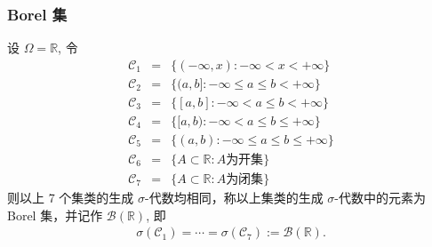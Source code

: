\begin{frame}
	\frametitle{Borel 集}
	\begin{exam}
		设 $\Omega=\mathbb{R}$, 令
		\begin{eqnarray*}
			\mathcal{C}_1&=&\{(-\infty,x):-\infty<x<+\infty\}\\
			\mathcal{C}_2&=&\{(a,b]:-\infty\leq a\leq b<+\infty\}\\
			\mathcal{C}_3&=&\{[a,b]:-\infty< a\leq b<+\infty\}\\
			\mathcal{C}_4&=&\{[a,b):-\infty< a\leq b\leq+\infty\}\\
			\mathcal{C}_5&=&\{(a,b):-\infty\leq a\leq b\leq+\infty\}\\
			\mathcal{C}_6&=&\{A\subset\mathbb{R}:A\mbox{为开集}\}\\
			\mathcal{C}_7&=&\{A\subset\mathbb{R}:A\mbox{为闭集}\}
		\end{eqnarray*}
		则以上 7 个集类的生成 $\sigma$-代数均相同，称以上集类的生成 $\sigma$-代数中的元素为 Borel 集，并记作 $\mathcal{B}(\mathbb{R})$, 即
		\begin{eqnarray*}
			\sigma(\mathcal{C}_1)=\cdots=\sigma(\mathcal{C}_7):=\mathcal{B}(\mathbb{R}).
		\end{eqnarray*}

	\end{exam}
\end{frame}







